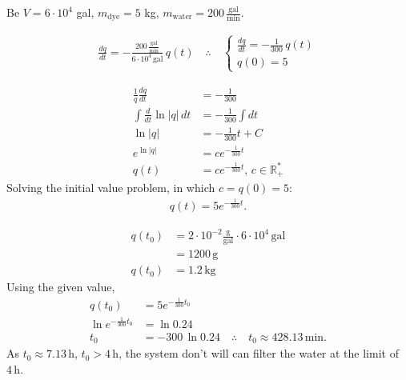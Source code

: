 \begin{solution}
	Be $V=6\cdot 10^4$ gal, $m_{\text{dye}}=5$ kg, $m_{\text{water}}=200\, \frac{\text{gal}}{\text{min}}$.
	\begin{solparts}
		\item
		\begin{gather*}
			\frac{dq}{dt}=-\frac{200\, \frac{\text{gal}}{\text{min}}}{6\cdot 10^4\, \text{gal}}\, q(t)\quad \therefore \quad \boxed{
				\begin{cases}
					\frac{dq}{dt}=-\frac{1}{300}\, q(t)\\
					q(0)=5
				\end{cases}
			}
		\end{gather*}
		
		\item
		\begin{align*}
			\frac{1}{q}\frac{dq}{dt}&=-\frac{1}{300}\\
			\int \frac{d}{dt} \ln|q|\, dt&=-\frac{1}{300}\int dt\\
			\ln |q|&=-\frac{1}{300}t+C\\
			e^{\ln |q|}&=ce^{-\frac{1}{300}t}\\
			q(t)&=ce^{-\frac{1}{300}t},\, c \in \mathbb{R^*_+}
		\end{align*}
		Solving the initial value problem, in which $c=q(0)=5$:
		\begin{gather*}
			\boxed{q(t)=5e^{-\frac{1}{300}t}}.
		\end{gather*}
		
		\item
		\begin{align*}
			q(t_0)&=2\cdot 10^{-2}\frac{\text{g}}{\text{gal}}\cdot 6\cdot 10^4\, \text{gal}\\
			&=1200\, \text{g}\\
			q(t_0)&=1.2\, \text{kg}
		\end{align*}
		Using the given value,
		\begin{align*}
			q(t_0)&=5e^{-\frac{1}{300}t_0}\\
			\ln e^{-\frac{1}{300}t_0}&=\ln 0.24\\
			t_0&=-300\, \ln 0.24 \quad \therefore \quad
			\boxed{t_0\approx 428.13\,\text{min}}.
		\end{align*}
		As $t_0\approx 7.13\,\text{h}$, $t_0>4\,\text{h}$, the system don't will can filter the water at the limit of $4\, \text{h}$.
		

\end{solparts}
\end{solution}
